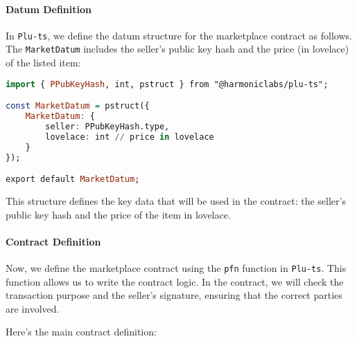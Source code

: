 \paragraph{Datum Definition}
In \texttt{Plu-ts}, we define the datum structure for the marketplace contract as follows. The \texttt{MarketDatum} includes the seller’s public key hash and the price (in lovelace) of the listed item:

\begin{lstlisting}[language=haskell, caption=Datum Definition in Plu-ts]
import { PPubKeyHash, int, pstruct } from "@harmoniclabs/plu-ts";

const MarketDatum = pstruct({ 
    MarketDatum: { 
        seller: PPubKeyHash.type, 
        lovelace: int // price in lovelace
    }
});

export default MarketDatum;
\end{lstlisting}

This structure defines the key data that will be used in the contract: the seller’s public key hash and the price of the item in lovelace.

\paragraph{Contract Definition}
Now, we define the marketplace contract using the \texttt{pfn} function in \texttt{Plu-ts}. This function allows us to write the contract logic. In the contract, we will check the transaction purpose and the seller’s signature, ensuring that the correct parties are involved.

Here’s the main contract definition:


